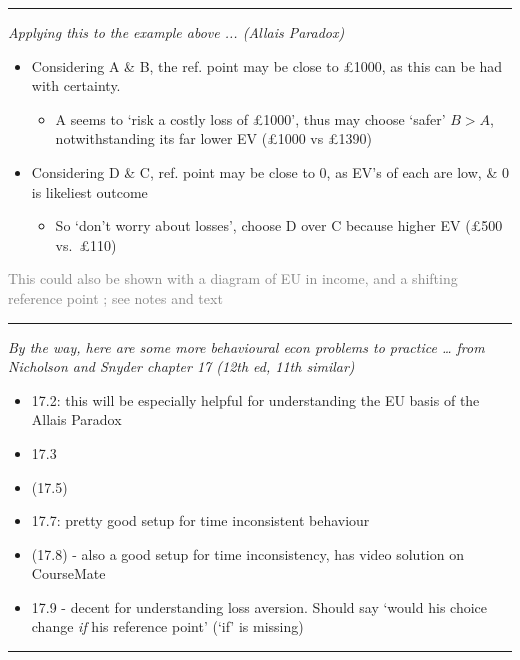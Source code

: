 \documentclass[]{article}
\providecommand{\tightlist}{%
  \setlength{\itemsep}{0pt}\setlength{\parskip}{0pt}}
\begin{document}
\begin{center}\rule{0.5\linewidth}{\linethickness}\end{center}

\bigskip

\textit{Applying this to the example above ... (Allais Paradox)}

\begin{itemize}
\item
  Considering A \& B, the ref. point may be close to \pounds1000, as
  this can be had with certainty.

  \begin{itemize}
  \tightlist
  \item
    A seems to `risk a costly loss of \pounds1000', thus may choose
    `safer' \(B>A\), notwithstanding its far lower EV (\pounds1000 vs
    \pounds1390)
  \end{itemize}
\end{itemize}

\bigskip

\begin{itemize}
\item
  Considering D \& C, ref. point may be close to 0, as EV's of each are
  low, \& 0 is likeliest outcome

  \begin{itemize}
  \tightlist
  \item
    So `don't worry about losses', choose D over C because higher EV
    (\pounds500 vs.~\pounds110)
  \end{itemize}
\end{itemize}

\textcolor{gray}{This could also be shown with a diagram of EU in income, and a  shifting reference point ; see notes and text}

\begin{center}\rule{0.5\linewidth}{\linethickness}\end{center}

\emph{By the way, here are some more behavioural econ problems to
practice \ldots{} from Nicholson and Snyder chapter 17 (12th ed, 11th
similar)}

\begin{itemize}
\tightlist
\item
  17.2: this will be especially helpful for understanding the EU basis
  of the Allais Paradox
\item
  17.3
\item
  (17.5)
\item
  17.7: pretty good setup for time inconsistent behaviour
\item
  (17.8) - also a good setup for time inconsistency, has video solution
  on CourseMate
\item
  17.9 - decent for understanding loss aversion. Should say `would his
  choice change \emph{if} his reference point' (`if' is missing)
\end{itemize}

\begin{center}\rule{0.5\linewidth}{\linethickness}\end{center}
\end{document}
